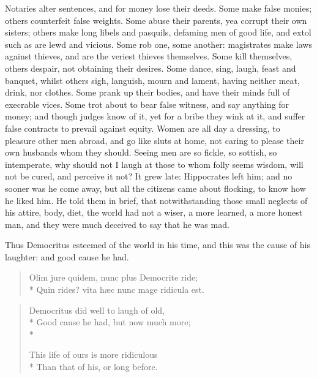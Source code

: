 {Notaries alter sentences, and for money lose their deeds. Some make
false monies; others counterfeit false weights. Some abuse their
parents, yea corrupt their own sisters; others make long libels and
pasquils, defaming men of good life, and extol such as are lewd and
vicious. Some rob one, some another: magistrates make laws against
thieves, and are the veriest thieves themselves. Some kill themselves,
others despair, not obtaining their desires. Some dance, sing, laugh,
feast and banquet, whilst others sigh, languish, mourn and lament,
having neither meat, drink, nor clothes. Some prank up their
bodies, and have their minds full of execrable vices. Some trot about
to bear false witness, and say anything for money; and though
judges know of it, yet for a bribe they wink at it, and suffer false
contracts to prevail against equity. Women are all day a dressing, to
pleasure other men abroad, and go like sluts at home, not caring to
please their own husbands whom they should. Seeing men are so fickle,
so sottish, so intemperate, why should not I laugh at those to whom
folly seems wisdom, will not be cured, and perceive it not?
It grew late: Hippocrates left him; and no sooner was he come away, but
all the citizens came about flocking, to know how he liked him. He told
them in brief, that notwithstanding those small neglects of his attire,
body, diet, the world had not a wiser, a more learned, a more
honest man, and they were much deceived to say that he was mad.

Thus Democritus esteemed of the world in his time, and this was the
cause of his laughter: and good cause he had.
%
\begin{latin}
\begin{verse}
Olim jure quidem, nunc plus Democrite ride;\\*
Quin rides? vita h\ae{}c nunc mage ridicula est.
\end{verse}
\end{latin}
\translationrule
\begin{verse}
Democritus did well to laugh of old,\\*
Good cause he had, but now much more;\\*

This life of ours is more ridiculous\\*
Than that of his, or long before.
\end{verse}
%

}
